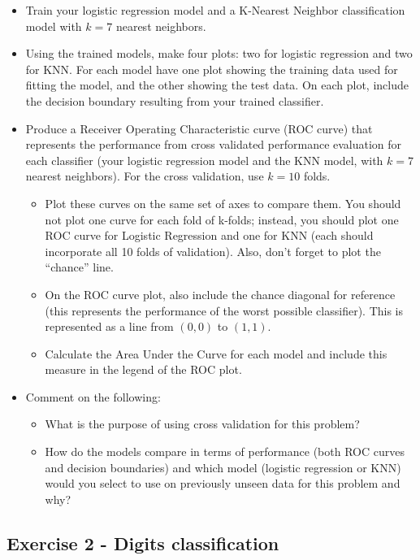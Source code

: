 \documentclass[
  letterpaper,
  DIV=11,
  numbers=noendperiod]{scrartcl}
\providecommand{\tightlist}{%
  \setlength{\itemsep}{0pt}\setlength{\parskip}{0pt}}\usepackage{longtable,booktabs,array}
\begin{document}
\begin{itemize}
\item
  Train your logistic regression model and a K-Nearest Neighbor
  classification model with \(k=7\) nearest neighbors.
\item
  Using the trained models, make four plots: two for logistic regression
  and two for KNN. For each model have one plot showing the training
  data used for fitting the model, and the other showing the test data.
  On each plot, include the decision boundary resulting from your
  trained classifier.
\item
  Produce a Receiver Operating Characteristic curve (ROC curve) that
  represents the performance from cross validated performance evaluation
  for each classifier (your logistic regression model and the KNN model,
  with \(k=7\) nearest neighbors). For the cross validation, use
  \(k=10\) folds.

  \begin{itemize}
  \tightlist
  \item
    Plot these curves on the same set of axes to compare them. You
    should not plot one curve for each fold of k-folds; instead, you
    should plot one ROC curve for Logistic Regression and one for KNN
    (each should incorporate all 10 folds of validation). Also, don't
    forget to plot the ``chance'' line.
  \item
    On the ROC curve plot, also include the chance diagonal for
    reference (this represents the performance of the worst possible
    classifier). This is represented as a line from \((0,0)\) to
    \((1,1)\).
  \item
    Calculate the Area Under the Curve for each model and include this
    measure in the legend of the ROC plot.
  \end{itemize}
\item
  Comment on the following:

  \begin{itemize}
  \tightlist
  \item
    What is the purpose of using cross validation for this problem?
  \item
    How do the models compare in terms of performance (both ROC curves
    and decision boundaries) and which model (logistic regression or
    KNN) would you select to use on previously unseen data for this
    problem and why?
  \end{itemize}
\end{itemize}

\subsection{Exercise 2 - Digits
classification}\label{exercise-2---digits-classification}
\end{document}

